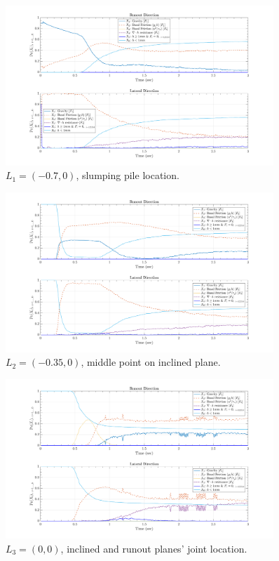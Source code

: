 \documentclass{article}
\begin{document}
\begin{figure}[H]
\centering
	\includegraphics[width=0.9\textwidth]{InclinedPlane/LocalRecords/DominancePr_x1P.png}
	\caption{$L_1=(-0.7,0)$, slumping pile location.}
	\label{fig:Ramp-Prx1P}
\end{figure}

\begin{figure}[H]
\centering
	\includegraphics[width=0.9\textwidth]{InclinedPlane/LocalRecords/DominancePr_x2P.png}
	\caption{$L_2=(-0.35,0)$, middle point on inclined plane.}
	\label{fig:Ramp-Prx2P}
\end{figure}

\begin{figure}[H]
\centering
	\includegraphics[width=0.9\textwidth]{InclinedPlane/LocalRecords/DominancePr_x3P.png}
	\caption{$L_3=(0,0)$, inclined and runout planes' joint location.}
	\label{fig:Ramp-Prx3P}
\end{figure}
\end{document}

